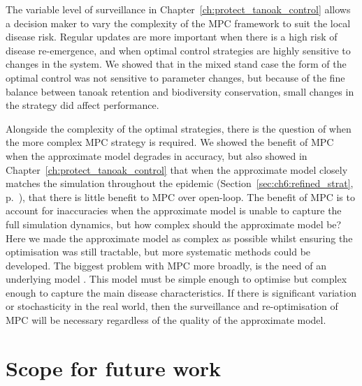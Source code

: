 The variable level of surveillance in Chapter~\ref{ch:protect_tanoak_control} allows a decision maker to vary the complexity of the MPC framework to suit the local disease risk. Regular updates are more important when there is a high risk of disease re-emergence, and when optimal control strategies are highly sensitive to changes in the system. We showed that in the mixed stand case the form of the optimal control was not sensitive to parameter changes, but because of the fine balance between tanoak retention and biodiversity conservation, small changes in the strategy did affect performance.

Alongside the complexity of the optimal strategies, there is the question of when the more complex MPC strategy is required. We showed the benefit of MPC when the approximate model degrades in accuracy, but also showed in Chapter~\ref{ch:protect_tanoak_control} that when the approximate model closely matches the simulation throughout the epidemic (Section~\ref{sec:ch6:refined_strat}, p.~\pageref{sec:ch6:refined_strat}), that there is little benefit to MPC over open-loop. The benefit of MPC is to account for inaccuracies when the approximate model is unable to capture the full simulation dynamics, but how complex should the approximate model be? Here we made the approximate model as complex as possible whilst ensuring the optimisation was still tractable, but more systematic methods could be developed. The biggest problem with MPC more broadly, is the need of an underlying model \citep{camacho_model_1995}. This model must be simple enough to optimise but complex enough to capture the main disease characteristics. If there is significant variation or stochasticity in the real world, then the surveillance and re-optimisation of MPC will be necessary regardless of the quality of the approximate model.

\section{Scope for future work}

